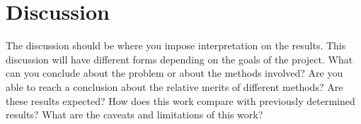 \documentclass[11pt]{article}
\begin{document}
\section{Discussion}

The discussion should be where you impose interpretation on the
results. This discussion will have different forms depending on the
goals of the project. What can you conclude about the problem or about
the methods involved? Are you able to reach a conclusion about the
relative merits of different methods? Are these results expected? How
does this work compare with previously determined results? What are
the caveats and limitations of this work?



\end{document}
